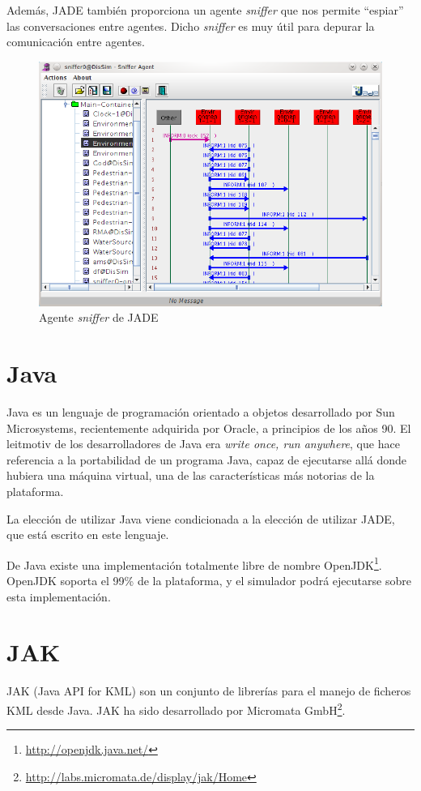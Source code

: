 Además, JADE también proporciona un agente {\em sniffer} que nos permite
``espiar'' las conversaciones entre agentes. Dicho {\em sniffer} es muy útil
para depurar la comunicación entre agentes.

\begin{figure}[H]
 \centering
 \includegraphics[width=120mm]{figuras/cap4/sniffer.png}
 \caption{Agente {\em sniffer} de JADE}
\end{figure}

\section{Java}

Java es un lenguaje de programación orientado a objetos desarrollado por Sun
Microsystems, recientemente adquirida por Oracle, a principios de los años 90.
El leitmotiv de los desarrolladores de Java era {\em write once, run anywhere},
que hace referencia a la portabilidad de un programa Java, capaz de ejecutarse
allá donde hubiera una máquina virtual, una de las características más notorias
de la plataforma.

La elección de utilizar Java viene condicionada a la elección de utilizar JADE,
que está escrito en este lenguaje.

De Java existe una implementación totalmente libre de nombre
OpenJDK\footnote{\url{http://openjdk.java.net/}}. OpenJDK soporta el 99\% de la
plataforma, y el simulador podrá ejecutarse sobre esta implementación.

\section{JAK}

JAK (Java API for KML) son un conjunto de librerías para el manejo de ficheros
KML desde Java. JAK ha sido desarrollado por Micromata
GmbH\footnote{\url{http://labs.micromata.de/display/jak/Home}}.

